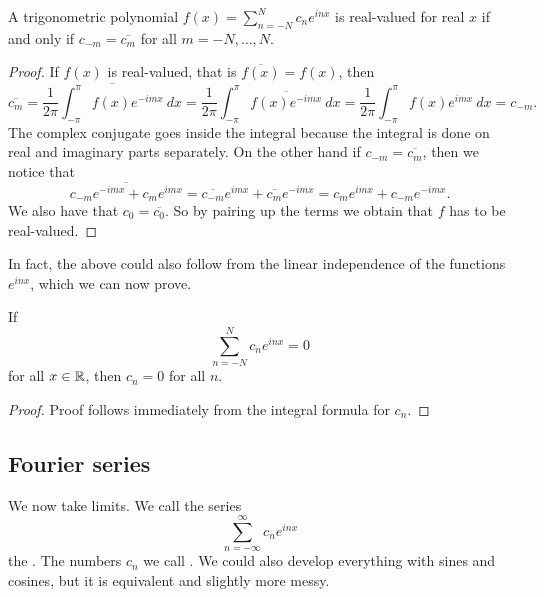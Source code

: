 \begin{prop}
A trigonometric polynomial
$f(x) = \sum_{n=-N}^N c_n e^{inx}$
is real-valued for real $x$ if
and only if $c_{-m} = \overline{c_m}$ for all $m=-N,\ldots,N$.
\end{prop}

\begin{proof}
If $f(x)$ is real-valued, that is $\overline{f(x)} = f(x)$, then
\begin{equation*}
\overline{c_m}
=
\overline{
\frac{1}{2\pi} \int_{-\pi}^\pi
f(x) e^{-imx} ~ dx
}
=
\frac{1}{2\pi} \int_{-\pi}^\pi
\overline{
f(x) e^{-imx} } ~ dx
=
\frac{1}{2\pi} \int_{-\pi}^\pi
f(x) e^{imx} ~ dx
= c_{-m} .
\end{equation*}
The complex conjugate goes inside the integral because the integral is
done on real and imaginary parts separately.  On the other hand if 
$c_{-m} = \overline{c_m}$, then we notice that
\begin{equation*}
\overline{c_{-m} e^{-imx}+ c_{m} e^{imx}}
=
\overline{c_{-m}} e^{imx}+ \overline{c_{m}} e^{-imx}
=
c_{m} e^{imx}+ c_{-m} e^{-imx} .
\end{equation*}
We also have that $c_0 = \overline{c_0}$.
So by pairing up the terms we obtain that $f$ has to be real-valued.
\end{proof}

In fact, the above could also follow from the linear independence of the
functions $e^{inx}$, which we can now prove.

\begin{prop}
If
\begin{equation*}
\sum_{n=-N}^N c_n e^{inx} = 0
\end{equation*}
for all $x \in {\mathbb{R}}$, then $c_n = 0$ for all $n$.
\end{prop}

\begin{proof}
Proof follows immediately from the integral formula for $c_n$.
\end{proof}

\subsection{Fourier series}

We now take limits.  We call the series
\begin{equation*}
\sum_{n=-\infty}^\infty c_n e^{inx}
\end{equation*}
the \emph{}.  The numbers $c_n$
we call \emph{}.  We could also develop everything with
sines and cosines, but it is equivalent and slightly more messy.

